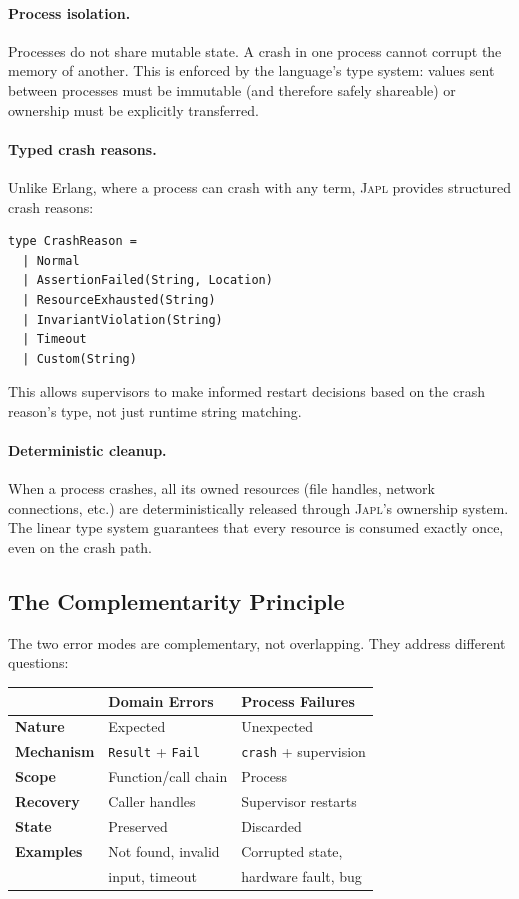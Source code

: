 \documentclass[11pt,twocolumn]{article}
\newcommand{\japl}{\textsc{Japl}}
\newcommand{\Fail}{\texttt{Fail}}
\newcommand{\Result}{\texttt{Result}}
\begin{document}
\paragraph{Process isolation.} Processes do not share mutable state. A crash in one process cannot corrupt the memory of another. This is enforced by the language's type system: values sent between processes must be immutable (and therefore safely shareable) or ownership must be explicitly transferred.

\paragraph{Typed crash reasons.} Unlike Erlang, where a process can crash with any term, \japl{} provides structured crash reasons:

\begin{lstlisting}
type CrashReason =
  | Normal
  | AssertionFailed(String, Location)
  | ResourceExhausted(String)
  | InvariantViolation(String)
  | Timeout
  | Custom(String)
\end{lstlisting}

This allows supervisors to make informed restart decisions based on the crash reason's type, not just runtime string matching.

\paragraph{Deterministic cleanup.} When a process crashes, all its owned resources (file handles, network connections, etc.) are deterministically released through \japl{}'s ownership system. The linear type system guarantees that every resource is consumed exactly once, even on the crash path.

\subsection{The Complementarity Principle}

The two error modes are complementary, not overlapping. They address different questions:

\begin{center}
\begin{tabular}{@{}lll@{}}
\toprule
& \textbf{Domain Errors} & \textbf{Process Failures} \\
\midrule
\textbf{Nature} & Expected & Unexpected \\
\textbf{Mechanism} & \Result{} + \Fail{} & \texttt{crash} + supervision \\
\textbf{Scope} & Function/call chain & Process \\
\textbf{Recovery} & Caller handles & Supervisor restarts \\
\textbf{State} & Preserved & Discarded \\
\textbf{Examples} & Not found, invalid & Corrupted state, \\
& input, timeout & hardware fault, bug \\
\bottomrule
\end{tabular}
\end{center}
\end{document}
